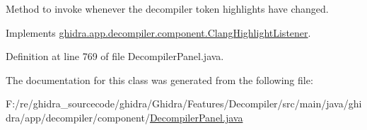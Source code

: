 Method to invoke whenever the decompiler token highlights have changed. 

Implements \mbox{\hyperlink{interfaceghidra_1_1app_1_1decompiler_1_1component_1_1_clang_highlight_listener_a658c0e626c607be6fa4206374bd861fa}{ghidra.\+app.\+decompiler.\+component.\+Clang\+Highlight\+Listener}}.



Definition at line 769 of file Decompiler\+Panel.\+java.



The documentation for this class was generated from the following file\+:\begin{DoxyCompactItemize}
\item 
F\+:/re/ghidra\+\_\+sourcecode/ghidra/\+Ghidra/\+Features/\+Decompiler/src/main/java/ghidra/app/decompiler/component/\mbox{\hyperlink{_decompiler_panel_8java}{Decompiler\+Panel.\+java}}\end{DoxyCompactItemize}
